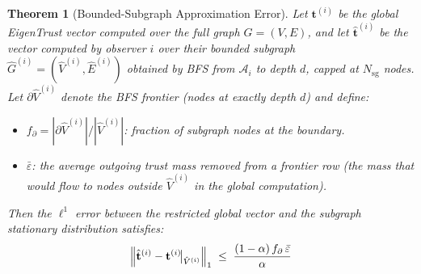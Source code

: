 \documentclass[11pt]{article}
\newtheorem{theorem}{Theorem}[section]
\begin{document}
\begin{theorem}[Bounded-Subgraph Approximation Error]\label{thm:subgraph_approx}
Let $\mathbf{t}^{(i)}$ be the global EigenTrust vector computed over the full graph $G = (V, E)$, and let $\hat{\mathbf{t}}^{(i)}$ be the vector computed by observer $i$ over their bounded subgraph $\hat{G}^{(i)} = (\hat{V}^{(i)}, \hat{E}^{(i)})$ obtained by BFS from $\mathcal{A}_i$ to depth $d$, capped at $N_{\text{sg}}$ nodes. Let $\partial \hat{V}^{(i)}$ denote the BFS frontier (nodes at exactly depth $d$) and define:
\begin{itemize}
    \item $f_\partial = |\partial \hat{V}^{(i)}| / |\hat{V}^{(i)}|$: fraction of subgraph nodes at the boundary.
    \item $\bar{\varepsilon}$: the average outgoing trust mass removed from a frontier row (the mass that would flow to nodes outside $\hat{V}^{(i)}$ in the global computation).
\end{itemize}
Then the $\ell^1$ error between the restricted global vector and the subgraph stationary distribution satisfies:
\begin{equation}\label{eq:subgraph_bound}
    \Bigl\|\hat{\mathbf{t}}^{(i)} - \mathbf{t}^{(i)}\!\big|_{\hat{V}^{(i)}}\Bigr\|_1
    \;\leq\;
    \frac{(1-\alpha)\, f_\partial\, \bar{\varepsilon}}{\alpha}
\end{equation}
\end{theorem}
\end{document}
